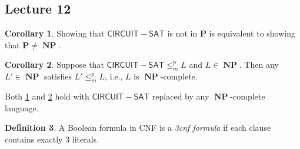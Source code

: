 \documentclass[10pt,letterpaper,cm]{nupset}
\theoremstyle{definition}
\newtheorem{definition}{Definition}[subsection]
\theoremstyle{theorem}
\newtheorem{corollary}[definition]{Corollary}
\theoremstyle{remark}
\newcommand{\1}{\mathbf{1}}
\newcommand{\0}{\vec 0}
\DeclareMathOperator{\NP}{\mathbf{NP}}
\begin{document}
\subsection{Lecture 12}

\begin{corollary}\label{cc1}
Showing that $\mathsf{CIRCUIT{-}SAT}$ is not in $\mathbf{P}$ is equivalent to showing that $\mathbf{P} \ne \NP$.
\end{corollary}

\begin{corollary}\label{cc2}
Suppose that $\mathsf{CIRCUIT{-}SAT} \leq_m^p L$ and $L\in \NP$. Then any $L' \in \NP$ satisfies $L' \leq_m^p L$, i.e., $L$ is $\NP$-complete.
\end{corollary}

\smallskip

Both \cref{cc1} and \cref{cc2} hold with $\mathsf{CIRCUIT{-}SAT}$ replaced by any $\NP$-complete language. 

\smallskip

\begin{definition}
A Boolean formula in CNF is a \textit{3cnf formula} if each clause contains exactly $3$ literals.  
\end{definition}
\end{document}
